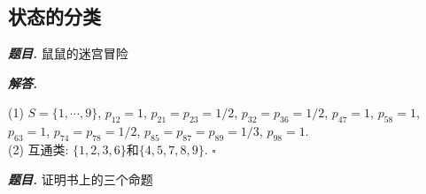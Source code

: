 \documentclass[10pt, a4paper, oneside]{ctexart}
\newenvironment{problem}{\begin{framed}\par\noindent\textbf{\textit{题目. }}}{\end{framed}\par}
\newenvironment{solution}{%
  \par\noindent\textbf{\textit{解答. }}\ignorespaces
}{%
  \hfill\ensuremath{\square}\par %
}
\begin{document}
\subsection{状态的分类}
\begin{problem}
    鼠鼠的迷宫冒险
\end{problem}
\begin{solution}
(1) $S=\{1,\cdots,9\}$, $p_{12}=1$, $p_{21}=p_{23}=1/2$, $p_{32}=p_{36}=1/2$, $p_{47}=1$, $p_{58}=1$, $p_{63}=1$, $p_{74}=p_{78}=1/2$, $p_{85}=p_{87}=p_{89}=1/3$, $p_{98}=1$.\\
(2) 互通类: $\{1,2,3,6\}$和$\{4,5,7,8,9\}$.  
\end{solution}

\begin{problem}
    证明书上的三个命题
\end{problem}
\end{document}
